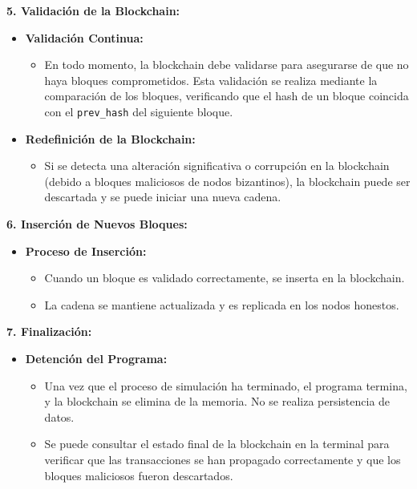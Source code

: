 {{    \vspace{0.5cm}

    \textbf{5. Validación de la Blockchain:}
    \begin{itemize}
        \item \textbf{Validación Continua:}
        \begin{itemize}
            \item En todo momento, la blockchain debe validarse para asegurarse de que no haya bloques comprometidos. Esta validación se realiza mediante la comparación de los bloques, verificando que el hash de un bloque coincida con el \texttt{prev\_hash} del siguiente bloque.
        \end{itemize}
        \item \textbf{Redefinición de la Blockchain:}
        \begin{itemize}
            \item Si se detecta una alteración significativa o corrupción en la blockchain (debido a bloques maliciosos de nodos bizantinos), la blockchain puede ser descartada y se puede iniciar una nueva cadena.
        \end{itemize}
    \end{itemize}

    \vspace{0.5cm}

    \textbf{6. Inserción de Nuevos Bloques:}
    \begin{itemize}
        \item \textbf{Proceso de Inserción:}
        \begin{itemize}
            \item Cuando un bloque es validado correctamente, se inserta en la blockchain.
            \item La cadena se mantiene actualizada y es replicada en los nodos honestos.
        \end{itemize}
    \end{itemize}

    \vspace{0.5cm}

    \textbf{7. Finalización:}
    \begin{itemize}
        \item \textbf{Detención del Programa:}
        \begin{itemize}
            \item Una vez que el proceso de simulación ha terminado, el programa termina, y la blockchain se elimina de la memoria. No se realiza persistencia de datos.
            \item Se puede consultar el estado final de la blockchain en la terminal para verificar que las transacciones se han propagado correctamente y que los bloques maliciosos fueron descartados.
        \end{itemize}
    \end{itemize}

}}
